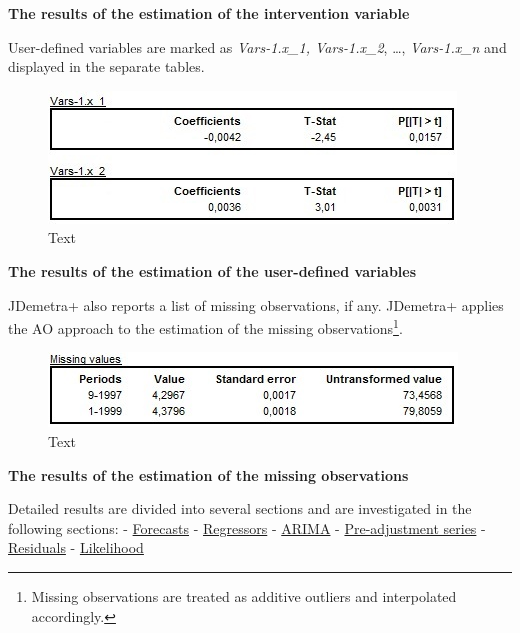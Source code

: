 \documentclass[
  letterpaper,
  DIV=11,
  numbers=noendperiod]{scrreprt}
\begin{document}
\textbf{The results of the estimation of the intervention variable}

User-defined variables are marked as \emph{Vars-1.x\_1, Vars-1.x\_2},
\ldots, \emph{Vars-1.x\_n} and displayed in the separate tables.

\begin{figure}

{\centering \includegraphics{./All_images/image39_RMSB.jpg}

}

\caption{Text}

\end{figure}

\textbf{The results of the estimation of the user-defined variables}

JDemetra+ also reports a list of missing observations, if any. JDemetra+
applies the AO approach to the estimation of the missing
observations\footnote{Missing observations are treated as additive
  outliers and interpolated accordingly.}.

\begin{figure}

{\centering \includegraphics{./All_images/image40_RMSB.jpg}

}

\caption{Text}

\end{figure}

\textbf{The results of the estimation of the missing observations}

Detailed results are divided into several sections and are investigated
in the following sections: -
\href{../reference-manual/forecasts.html}{Forecasts} -
\href{../reference-manual/regressors.html}{Regressors} -
\href{../reference-manual/arima.html}{ARIMA} -
\href{../reference-manual/pre-adjustment-series.html}{Pre-adjustment
series} - \href{../reference-manual/residuals.html}{Residuals} -
\href{../reference-manual/likelihood.html}{Likelihood}
\end{document}
